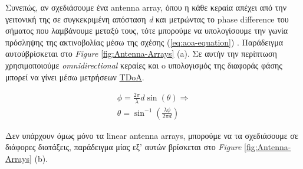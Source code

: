 Συνεπώς, αν σχεδιάσουμε ένα antenna array, όπου η κάθε κεραία απέχει από την γειτονική της σε συγκεκριμένη απόσταση \emph{d} και μετρώντας 
το phase difference του σήματος που λαμβάνουμε μεταξύ τους, τότε μπορούμε να υπολογίσουμε την γωνία πρόσληψης της ακτινοβολίας μέσω της 
σχέσης (\ref{eq:aoa-equation}) \cite{wsn-Localization-techniques} \cite{youtube-phase-difference-equation}. Παράδειγμα αυτού\udot βρίσκεται στο \emph{Figure} \ref{fig:Antenna-Arrays} (a).
Σε αυτήν την περίπτωση χρησιμοποιούμε \emph{omnidirectional} κεραίες και o υπολογισμός της διαφοράς φάσης μπορεί να γίνει
μέσω μετρήσεων \hyperref[abbr:TDoA]{TDoA}.

\begin{gather} 
	\phi = \frac{2\pi}{\lambda}d\sin(\theta) \Rightarrow \nonumber \\[2pt]
	\theta = \sin^{-1}\left(\frac{\lambda \phi}{2\pi d}\right) \label{eq:aoa-equation}
\end{gather}

Δεν υπάρχουν όμως μόνο τα linear antenna arrays, μπορούμε να τα σχεδιάσουμε σε διάφορες διατάξεις, 
παράδειγμα μίας εξ' αυτών βρίσκεται στο \emph{Figure} \ref{fig:Antenna-Arrays} (b).


